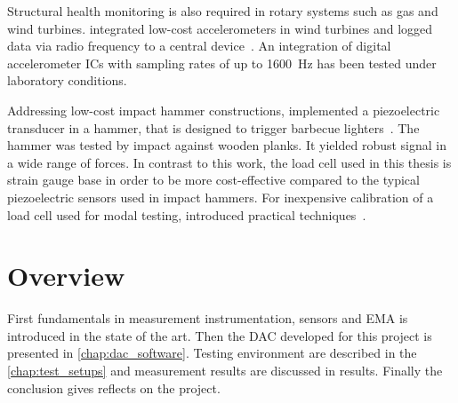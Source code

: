 Structural health monitoring is also required in rotary systems such as gas and wind turbines. \citeauthor{esu2014integration} integrated low-cost accelerometers in wind turbines and logged data via radio frequency to a central device~\cite{esu2014integration}. An integration of digital accelerometer \ac{IC}s with sampling rates of up to \SI{1600}{\hertz} has been tested under laboratory conditions.

Addressing low-cost impact hammer constructions, \citeauthor{waltham2009construction} implemented a piezoelectric transducer in a hammer, that is designed to trigger barbecue lighters~\cite{waltham2009construction}. The hammer was tested by impact against wooden planks. It yielded robust signal in a wide range of forces. In contrast to this work, the load cell used in this thesis is strain gauge base in order to be more cost-effective compared to the typical piezoelectric sensors used in impact hammers. For inexpensive calibration of a load cell used for modal testing, \citeauthor{wang2015practical} introduced practical techniques~\cite{wang2015practical}.

\section{Overview}

First fundamentals in measurement instrumentation, sensors and \ac{EMA} is introduced in the state of the art. Then the \acf{DAC} developed for this project is presented in \autoref{chap:dac_software}. Testing environment are described in the \autoref{chap:test_setups} and measurement results are discussed in results. Finally the conclusion gives reflects on the project.
